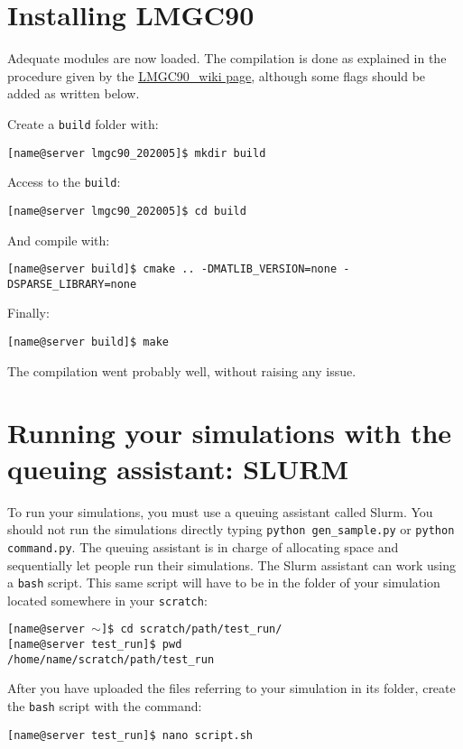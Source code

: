 \documentclass[12pt]{article}
\begin{document}
\section*{Installing LMGC90}
Adequate modules are now loaded. The compilation is done as explained in the procedure given by the \href{https://git-xen.lmgc.univ-montp2.fr/lmgc90/lmgc90_user/-/wikis/Compilation}{\underline{LMGC90\_wiki page}}, although some flags should be added as written below.

Create a \texttt{build} folder with:
\begin{tcolorbox}
\texttt{[name@server lmgc90\_202005]\$ mkdir build} 
\end{tcolorbox}
Access to the \texttt{build}:
\begin{tcolorbox}
\texttt{[name@server lmgc90\_202005]\$ cd build}
\end{tcolorbox}
And compile with:
\begin{tcolorbox}
\texttt{[name@server build]\$ cmake .. -DMATLIB\_VERSION=none -DSPARSE\_LIBRARY=none} 
\end{tcolorbox}
Finally:
\begin{tcolorbox}
\texttt{[name@server build]\$ make} 
\end{tcolorbox}

The compilation went probably well, without raising any issue.


\section*{Running your simulations with the queuing assistant: SLURM}
To run your simulations, you must use a queuing assistant called Slurm. You should not run the simulations directly typing \texttt{python gen\_sample.py} or \texttt{python command.py}. The
queuing assistant is in charge of allocating space and sequentially let people run their simulations. The Slurm assistant can work using a \texttt{bash} script. This same script will have to be in the folder of your simulation located somewhere in your \texttt{scratch}:
\begin{tcolorbox}
\texttt{[name@server $\sim$]\$ cd scratch/path/test\_run/}\\
\texttt{[name@server test\_run]\$ pwd}\\
\texttt{/home/name/scratch/path/test\_run}
\end{tcolorbox}

After you have uploaded the files referring to your simulation in its folder, create the \texttt{bash} script with the command:
\begin{tcolorbox}
\texttt{[name@server test\_run]\$ nano script.sh} 
\end{tcolorbox}
\end{document}
